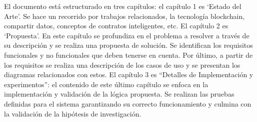 El documento está estructurado en tres capítulos: el capítulo 1 es `Estado del Arte'. Se hace un recorrido por trabajos relacionados, la tecnología blockchain, compartir datos, conceptos de contratos inteligentes, etc. El capítulo 2 es `Propuesta'. En este capítulo se profundiza en el problema a resolver a través de su descripción y se realiza una propuesta de solución. Se identifican los requisitos funcionales y no funcionales que deben tenerse en cuenta. Por último, a partir de los requisitos se realiza una descripción de los casos de uso y se presentan los diagramas relacionados con estos. El capítulo 3 es ``Detalles de Implementación y experimentos'': el contenido de este último capítulo se enfoca en la implementación y validación de la lógica propuesta. Se realizan las pruebas definidas para el sistema garantizando su correcto funcionamiento y culmina con la validación de la hipótesis de investigación.








